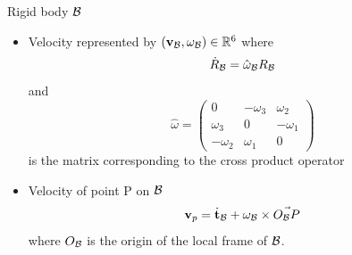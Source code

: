 \begin{frame} {Rigid body ${\cal B}$}
  \begin{itemize}
    \item Velocity represented by $(\textbf{v}_{{\cal B}},\omega_{{\cal B}})\in \mathbb{R}^6$ where
      \pause
      $$
      \dot{R}_{{\cal B}} = \hat{\omega}_{{\cal B}} R_{{\cal B}}
      $$
      and
      $$
      \hat {\omega} = \left(\begin{array}{ccc}
        0 & -\omega_3 & \omega_2 \\
        \omega_3 & 0 & -\omega_1 \\
        -\omega_2 & \omega_1 & 0
        \end{array}\right)
      $$
      is the matrix corresponding to the cross product operator
      \pause
    \item Velocity of point P on ${\cal B}$
      $$
      \textbf{v}_p = \dot{\textbf{t}}_{{\cal B}} + \omega_{{\cal B}} \times \vec{O_{{\cal B}}P}
      $$
      where $O_{{\cal B}}$ is the origin of the local frame of ${\cal B}$.
  \end{itemize}
\end{frame}

%
%


